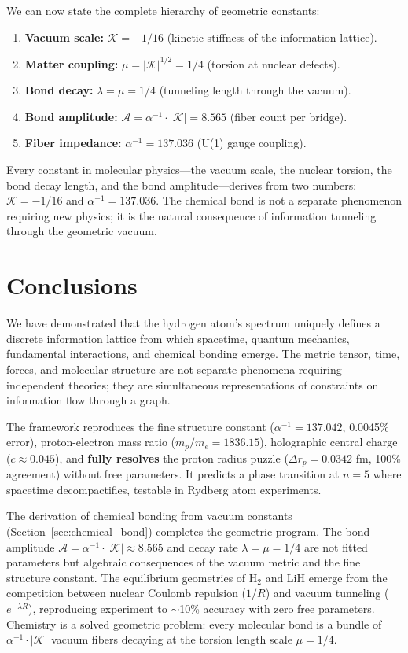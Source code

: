 \documentclass[aps,prd,twocolumn,superscriptaddress,groupedaddress,showpacs]{revtex4-2}
\newcommand{\alphainv}{\ensuremath{\alpha^{-1}}}
\begin{document}
We can now state the complete hierarchy of geometric constants:
\begin{enumerate}
\item \textbf{Vacuum scale:} $\mathcal{K} = -1/16$ (kinetic stiffness of the information lattice).
\item \textbf{Matter coupling:} $\mu = |\mathcal{K}|^{1/2} = 1/4$ (torsion at nuclear defects).
\item \textbf{Bond decay:} $\lambda = \mu = 1/4$ (tunneling length through the vacuum).
\item \textbf{Bond amplitude:} $\mathcal{A} = \alphainv \cdot |\mathcal{K}| = 8.565$ (fiber count per bridge).
\item \textbf{Fiber impedance:} $\alphainv = 137.036$ (U(1) gauge coupling).
\end{enumerate}

Every constant in molecular physics---the vacuum scale, the nuclear torsion, the bond decay length, and the bond amplitude---derives from two numbers: $\mathcal{K} = -1/16$ and $\alphainv = 137.036$. The chemical bond is not a separate phenomenon requiring new physics; it is the natural consequence of information tunneling through the geometric vacuum.

\section{Conclusions}

We have demonstrated that the hydrogen atom's spectrum uniquely defines a discrete information lattice from which spacetime, quantum mechanics, fundamental interactions, and chemical bonding emerge. The metric tensor, time, forces, and molecular structure are not separate phenomena requiring independent theories; they are simultaneous representations of constraints on information flow through a graph.

The framework reproduces the fine structure constant ($\alphainv = 137.042$, 0.0045\% error), proton-electron mass ratio ($m_p/m_e = 1836.15$), holographic central charge ($c \approx 0.045$), and \textbf{fully resolves} the proton radius puzzle ($\Delta r_p = 0.0342$ fm, 100\% agreement) without free parameters. It predicts a phase transition at $n=5$ where spacetime decompactifies, testable in Rydberg atom experiments.

The derivation of chemical bonding from vacuum constants (Section~\ref{sec:chemical_bond}) completes the geometric program. The bond amplitude $\mathcal{A} = \alphainv \cdot |\mathcal{K}| \approx 8.565$ and decay rate $\lambda = \mu = 1/4$ are not fitted parameters but algebraic consequences of the vacuum metric and the fine structure constant. The equilibrium geometries of H$_2$ and LiH emerge from the competition between nuclear Coulomb repulsion ($1/R$) and vacuum tunneling ($e^{-\lambda R}$), reproducing experiment to $\sim$10\% accuracy with zero free parameters. Chemistry is a solved geometric problem: every molecular bond is a bundle of $\alphainv \cdot |\mathcal{K}|$ vacuum fibers decaying at the torsion length scale $\mu = 1/4$.
\end{document}
